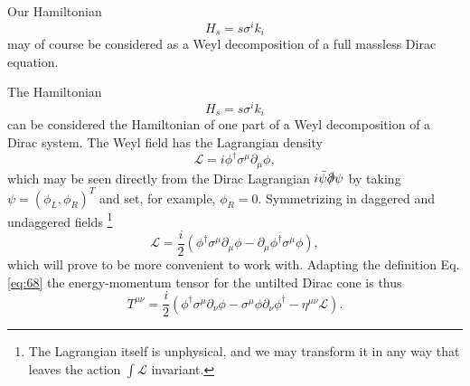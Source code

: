 Our Hamiltonian
\[
H_s = s \sigma^i k_i
\]
may of course be considered as a Weyl decomposition of a full massless Dirac equation.


The Hamiltonian
\[
H_s = s \sigma^i k_i
\]
can be considered the Hamiltonian of one part of a Weyl decomposition of a Dirac system.
The Weyl field has the Lagrangian density \cite{kachelriessQuantumFieldsHubble2018}
\begin{equation}
  \label{eq:69}
  \mathcal{L} = i \phi^{\dagger} \sigma^{\mu} \partial_{\mu} \phi,
\end{equation}
which may be seen directly from the Dirac Lagrangian \( i \bar{\psi} \slashed{\partial } \psi  \) by taking \( \psi = (\phi_L, \phi_R)^T \) and set, for example, \( \phi _R = 0 \).
Symmetrizing in daggered and undaggered fields
\footnote{The Lagrangian itself is unphysical, and we may transform it in any way that leaves the action \( \int \mathcal{L} \) invariant.}
\[
  \mathcal{L} = \frac{i}{2} \left(\phi^{\dagger} \sigma^{\mu} \partial_{\mu} \phi - \partial_{\mu} \phi^{\dagger} \sigma^{\mu} \phi \right),
\]
which will prove to be more convenient to work with.
Adapting the definition Eq. \eqref{eq:68} the energy-momentum tensor for the untilted Dirac cone is thus
\begin{equation}
  \label{eq:70}
  T^{\mu \nu} =
  \frac{i}{2} (
  \phi^{\dagger} \sigma^{\mu} \partial_{\nu} \phi
  - \sigma^{\mu} \phi \partial_{\nu} \phi^{\dagger}
  - \eta^{\mu \nu} \mathcal{L}
  ).
\end{equation}

